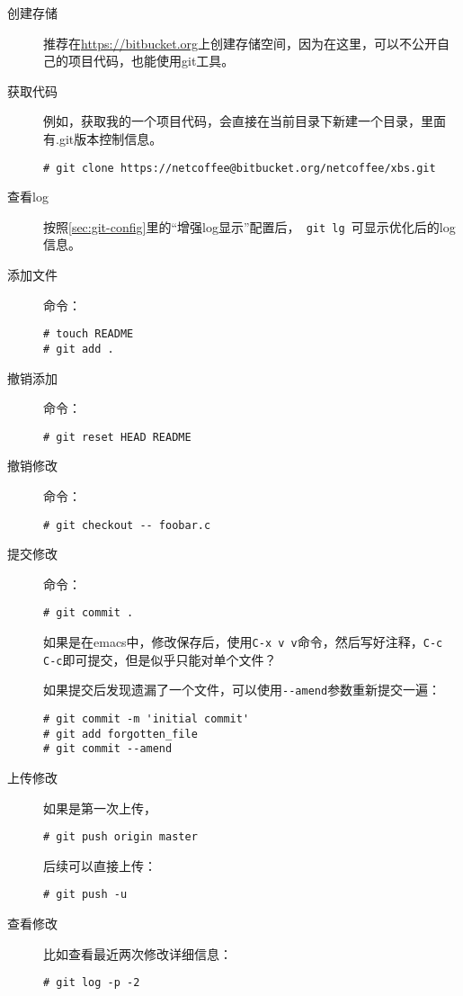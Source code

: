 \begin{description}
\item[创建存储] 推荐在\url{https://bitbucket.org}上创建存储空间，因为在这里，可以不公开自己的项目代码，也能使用git工具。
\item[获取代码] 例如，获取我的一个项目代码，会直接在当前目录下新建一个目录，里面有.git版本控制信息。
\begin{lstlisting}[numbers=none]
# git clone https://netcoffee@bitbucket.org/netcoffee/xbs.git
\end{lstlisting}

\item[查看log] 按照\ref{sec:git-config}里的“增强log显示”配置后，\verb| git lg |可显示优化后的log信息。
\item[添加文件] 命令：
\begin{lstlisting}[numbers=none]
# touch README
# git add .
\end{lstlisting}
\item[撤销添加] 命令：
\begin{lstlisting}[numbers=none]
# git reset HEAD README
\end{lstlisting}
\item[撤销修改] 命令：
\begin{lstlisting}[numbers=none]
# git checkout -- foobar.c
\end{lstlisting}
\item[提交修改] 命令：
\begin{lstlisting}[numbers=none]
# git commit .
\end{lstlisting}

如果是在emacs中，修改保存后，使用\verb|C-x v v|命令，然后写好注释，\verb|C-c C-c|即可提交，但是似乎只能对单个文件？

如果提交后发现遗漏了一个文件，可以使用\verb|--amend|参数重新提交一遍：
\begin{lstlisting}[numbers=none]
# git commit -m 'initial commit'
# git add forgotten_file
# git commit --amend
\end{lstlisting}
\item[上传修改] 
如果是第一次上传，
\begin{lstlisting}[numbers=none]
# git push origin master
\end{lstlisting}
后续可以直接上传：
\begin{lstlisting}[numbers=none]
# git push -u
\end{lstlisting}

\item[查看修改] 比如查看最近两次修改详细信息：
\begin{lstlisting}[numbers=none]
# git log -p -2
\end{lstlisting}

\end{description}

